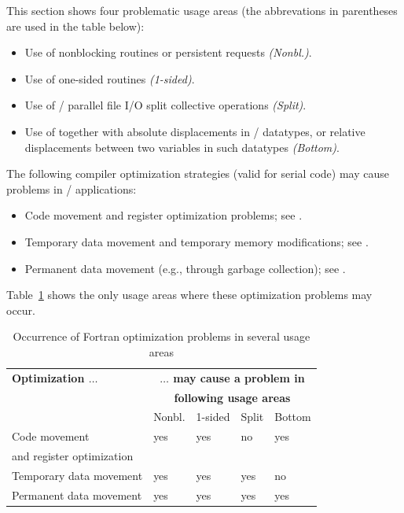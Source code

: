 This section shows four problematic usage areas
(the abbrevations in parentheses are used in the table below):
\begin{itemize}
\item Use of nonblocking routines or persistent requests \emph{(Nonbl.)}.
\item Use of one-sided routines \emph{(1-sided)}.
\item Use of \MPI/ parallel file I/O split collective operations \emph{(Split)}.
\item Use of  together with absolute displacements
in \MPI/ datatypes, or relative displacements between
two variables in such datatypes \emph{(Bottom)}.
\end{itemize}

The following compiler optimization strategies (valid for serial code)
may cause problems in \MPI/ applications:
\begin{itemize}
\item Code movement and register optimization problems;
      see .
\item Temporary data movement and temporary memory modifications;
      see .
\item Permanent data movement (e.g., through garbage collection);
      see .
\end{itemize}
Table~\ref{tab:Fortran-optim:occurrence} shows the only usage areas
where these optimization problems may occur.

\begin{table}[tpb]
\caption[Occurrence of Fortran optimization problems]{%
Occurrence of Fortran optimization problems in several usage areas}
\label{tab:Fortran-optim:occurrence}
\begin{center}
\begin{tabular}{l|l|l|l|l}
\textbf{Optimization $\ldots$}      &\multicolumn{4}{c}{\textbf{$\ldots$ may cause a problem in}}\\
                          &\multicolumn{4}{c}{\textbf{following usage areas}} \\
                           &Nonbl. &1-sided&Split  &Bottom \\
\hline
\hline
Code movement              &yes    &yes    &no     &yes    \\
and register optimization  &       &       &       &       \\
\hline
Temporary data movement    &yes    &yes    &yes    &no     \\
\hline
Permanent data movement    &yes    &yes    &yes    &yes    \\
\end{tabular}
\end{center}
\end{table}

